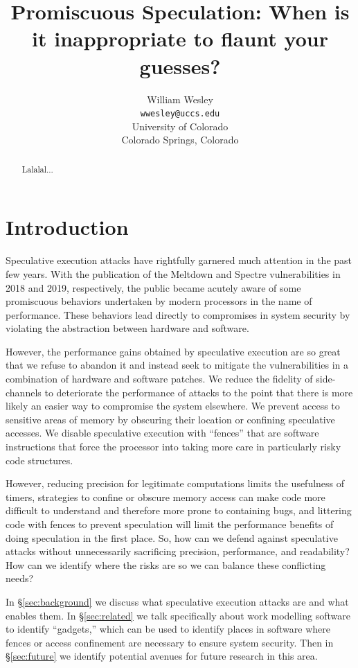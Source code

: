 \documentclass[11pt,conference]{IEEEtran}
\title{Promiscuous Speculation: When is it inappropriate to flaunt your guesses?}
\author{William Wesley \\
\texttt{wwesley@uccs.edu} \\
University of Colorado \\
Colorado Springs, Colorado}
\begin{document}
\maketitle

\begin{abstract}
Lalalal...
\end{abstract}

\section{Introduction}

Speculative execution attacks have rightfully garnered much attention in the past few years.
With the publication of the Meltdown\cite{meltdown} and Spectre\cite{spectre} vulnerabilities in 2018 and 2019, respectively, the public became acutely aware of some promiscuous behaviors undertaken by modern processors in the name of performance.
These behaviors lead directly to compromises in system security by violating the abstraction between hardware and software.

However, the performance gains obtained by speculative execution are so great that we refuse to abandon it and instead seek to mitigate the vulnerabilities in a combination of hardware and software patches.
We reduce the fidelity of side-channels to deteriorate the performance of attacks to the point that there is more likely an easier way to compromise the system elsewhere.
We prevent access to sensitive areas of memory by obscuring their location or confining speculative accesses.
We disable speculative execution with ``fences'' that are software instructions that force the processor into taking more care in particularly risky code structures.

However, reducing precision for legitimate computations limits the usefulness of timers, strategies to confine or obscure memory access can make code more difficult to understand and therefore more prone to containing bugs, and littering code with fences to prevent speculation will limit the performance benefits of doing speculation in the first place.
So, how can we defend against speculative attacks without unnecessarily sacrificing precision, performance, and readability?
How can we identify where the risks are so we can balance these conflicting needs?

In \S\ref{sec:background} we discuss what speculative execution attacks are and what enables them.
In \S\ref{sec:related} we talk specifically about work modelling software to identify ``gadgets,'' which can be used to identify places in software where fences or access confinement are necessary to ensure system security.
Then in \S\ref{sec:future} we identify potential avenues for future research in this area.
\end{document}
